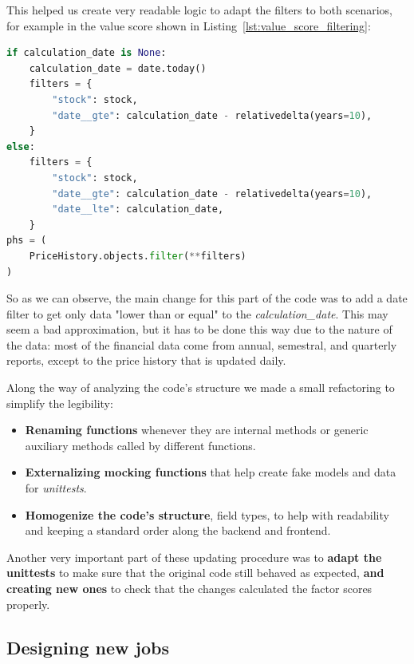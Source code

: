 \documentclass[11pt,english,a4paper,hidelinks]{book}
\begin{document}
\vspace{0.5cm}
\noindent This helped us create very readable logic to adapt the filters to both scenarios, for example in the value score shown in Listing~\ref{lst:value_score_filtering}:

\begin{lstlisting}[language=Python, caption={Value Score Filtering}, label={lst:value_score_filtering}]
if calculation_date is None:
    calculation_date = date.today()
    filters = {
        "stock": stock,
        "date__gte": calculation_date - relativedelta(years=10),
    }
else:
    filters = {
        "stock": stock,
        "date__gte": calculation_date - relativedelta(years=10),
        "date__lte": calculation_date,
    }
phs = (
    PriceHistory.objects.filter(**filters)
)
\end{lstlisting}

\noindent So as we can observe, the main change for this part of the code was to add a date filter to get only data "lower than or equal" to the \textit{calculation\_date}. This may seem a bad approximation, but it has to be done this way due to the nature of the data: most of the financial data come from annual, semestral, and quarterly reports, except to the price history that is updated daily.

\vspace{0.5cm}
\noindent Along the way of analyzing the code's structure we made a small refactoring to simplify the legibility:
\begin{itemize}
    \item \textbf{Renaming functions} whenever they are internal methods or generic auxiliary methods called by different functions.
    \item \textbf{Externalizing mocking functions} that help create fake models and data for \textit{\acrshort{unittest}s}.
    \item \textbf{Homogenize the code's structure}, field types, to help with readability and keeping a standard order along the backend and frontend.
\end{itemize}

\noindent Another very important part of these updating procedure was to \textbf{adapt the \acrshort{unittest}s} to make sure that the original code still behaved as expected, \textbf{and creating new ones} to check that the changes calculated the factor scores properly.

\subsection{Designing new \acrshort{job}s}
\end{document}
